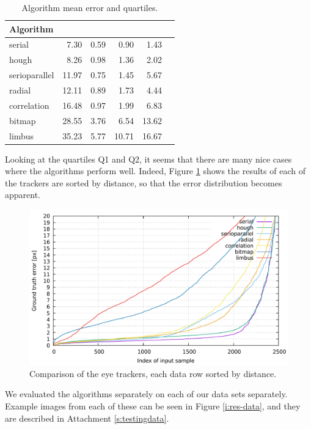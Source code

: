 \begin{table}[h]
\centering
\begin{tabular}{l@{\hspace{1.5cm}}D{.}{.}{3.2}D{.}{.}{3.2}D{.}{.}{3.2}D{.}{.}{3.2}D{.}{.}{3.2}}
\toprule
\textbf{Algorithm} &  &  &  &  \\
\midrule
serial & 7.30 & 0.59 & 0.90 & 1.43 \\
hough & 8.26 & 0.98 & 1.36 & 2.02 \\
serioparallel & 11.97 & 0.75 & 1.45 & 5.67 \\
radial & 12.11 & 0.89 & 1.73 & 4.44 \\
correlation & 16.48 & 0.97 & 1.99 & 6.83 \\
bitmap & 28.55 & 3.76 & 6.54 & 13.62 \\
limbus & 35.23 & 5.77 & 10.71 & 16.67 \\
\bottomrule
\end{tabular}
\caption{Algorithm mean error and quartiles.}\label{t:algo-mean}
\end{table}

Looking at the quartiles Q1 and Q2, it seems that there are many nice cases where the algorithms perform well.
Indeed, Figure \ref{i:res-graph} shows the results of each of the trackers are sorted by distance, so that the error distribution becomes apparent.

\begin{figure}[t]
	\centering
	\includegraphics[width=\linewidth]{img/res-graph.pdf}
	\caption{Comparison of the eye trackers, each data row sorted by distance.} \label{i:res-graph}
\end {figure}

We evaluated the algorithms separately on each of our data sets separately.
Example images from each of these can be seen in Figure \ref{i:res-data}, and they are described in Attachment \ref{s:testingdata}.


